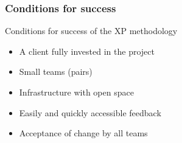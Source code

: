 \begin{frame}
    \frametitle{Conditions for success}
        \begin{block}{Conditions for success of the XP methodology}
            \begin{itemize}
                \item A client fully invested in the project
                \item Small teams (pairs)
                \item Infrastructure with open space
                \item Easily and quickly accessible feedback
                \item Acceptance of change by all teams
            \end{itemize}
        \end{block}
\end{frame}
